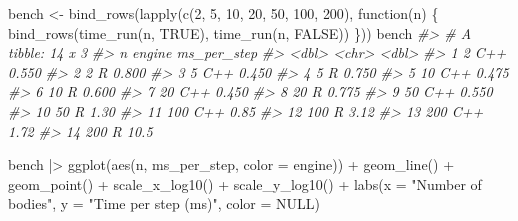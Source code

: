 \documentclass[
  10.5pt,
  letterpaper,
]{scrbook}
\newenvironment{Shaded}{\begin{snugshade}}{\end{snugshade}}
\newcommand{\AttributeTok}[1]{\textcolor[rgb]{0.00,0.00,0.00}{#1}}
\newcommand{\CommentTok}[1]{\textcolor[rgb]{0.00,0.00,0.00}{\textit{#1}}}
\newcommand{\ConstantTok}[1]{\textcolor[rgb]{0.00,0.00,0.00}{#1}}
\newcommand{\ControlFlowTok}[1]{\textcolor[rgb]{0.00,0.00,0.00}{#1}}
\newcommand{\DecValTok}[1]{\textcolor[rgb]{0.00,0.00,0.00}{#1}}
\newcommand{\FunctionTok}[1]{\textcolor[rgb]{0.00,0.00,0.00}{#1}}
\newcommand{\NormalTok}[1]{\textcolor[rgb]{0.00,0.00,0.00}{#1}}
\newcommand{\OtherTok}[1]{\textcolor[rgb]{0.00,0.00,0.00}{#1}}
\newcommand{\SpecialCharTok}[1]{\textcolor[rgb]{0.00,0.00,0.00}{#1}}
\newcommand{\StringTok}[1]{\textcolor[rgb]{0.00,0.00,0.00}{#1}}
\theoremstyle{plain}
\theoremstyle{remark}
\begin{document}
\begin{Shaded}
\begin{Highlighting}[]
\NormalTok{bench }\OtherTok{\textless{}{-}} \FunctionTok{bind\_rows}\NormalTok{(}\FunctionTok{lapply}\NormalTok{(}\FunctionTok{c}\NormalTok{(}\DecValTok{2}\NormalTok{, }\DecValTok{5}\NormalTok{, }\DecValTok{10}\NormalTok{, }\DecValTok{20}\NormalTok{, }\DecValTok{50}\NormalTok{, }\DecValTok{100}\NormalTok{, }\DecValTok{200}\NormalTok{), }\ControlFlowTok{function}\NormalTok{(n) \{}
  \FunctionTok{bind\_rows}\NormalTok{(}\FunctionTok{time\_run}\NormalTok{(n, }\ConstantTok{TRUE}\NormalTok{), }\FunctionTok{time\_run}\NormalTok{(n, }\ConstantTok{FALSE}\NormalTok{))}
\NormalTok{\}))}
\NormalTok{bench}
\CommentTok{\#\textgreater{} \# A tibble: 14 x 3}
\CommentTok{\#\textgreater{}        n engine ms\_per\_step}
\CommentTok{\#\textgreater{}    \textless{}dbl\textgreater{} \textless{}chr\textgreater{}        \textless{}dbl\textgreater{}}
\CommentTok{\#\textgreater{}  1     2 C++          0.550}
\CommentTok{\#\textgreater{}  2     2 R            0.800}
\CommentTok{\#\textgreater{}  3     5 C++          0.450}
\CommentTok{\#\textgreater{}  4     5 R            0.750}
\CommentTok{\#\textgreater{}  5    10 C++          0.475}
\CommentTok{\#\textgreater{}  6    10 R            0.600}
\CommentTok{\#\textgreater{}  7    20 C++          0.450}
\CommentTok{\#\textgreater{}  8    20 R            0.775}
\CommentTok{\#\textgreater{}  9    50 C++          0.550}
\CommentTok{\#\textgreater{} 10    50 R            1.30 }
\CommentTok{\#\textgreater{} 11   100 C++          0.85 }
\CommentTok{\#\textgreater{} 12   100 R            3.12 }
\CommentTok{\#\textgreater{} 13   200 C++          1.72 }
\CommentTok{\#\textgreater{} 14   200 R           10.5}
\end{Highlighting}
\end{Shaded}

\begin{Shaded}
\begin{Highlighting}[]
\NormalTok{bench }\SpecialCharTok{|\textgreater{}}
  \FunctionTok{ggplot}\NormalTok{(}\FunctionTok{aes}\NormalTok{(n, ms\_per\_step, }\AttributeTok{color =}\NormalTok{ engine)) }\SpecialCharTok{+}
  \FunctionTok{geom\_line}\NormalTok{() }\SpecialCharTok{+} \FunctionTok{geom\_point}\NormalTok{() }\SpecialCharTok{+}
  \FunctionTok{scale\_x\_log10}\NormalTok{() }\SpecialCharTok{+} \FunctionTok{scale\_y\_log10}\NormalTok{() }\SpecialCharTok{+}
  \FunctionTok{labs}\NormalTok{(}\AttributeTok{x =} \StringTok{"Number of bodies"}\NormalTok{, }\AttributeTok{y =} \StringTok{"Time per step (ms)"}\NormalTok{, }\AttributeTok{color =} \ConstantTok{NULL}\NormalTok{)}
\end{Highlighting}
\end{Shaded}
\end{document}
